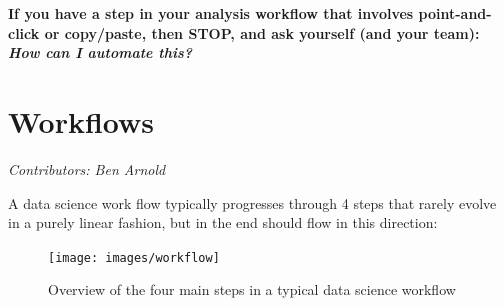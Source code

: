 \documentclass[
]{book}
\begin{document}
\textbf{If you have a step in your analysis workflow that involves point-and-click or copy/paste, then STOP, and ask yourself (and your team): } \textbf{\emph{How can I automate this?}}

\chapter{Workflows}\label{workflows}

\emph{Contributors: Ben Arnold}

A data science work flow typically progresses through 4 steps that rarely evolve in a purely linear fashion, but in the end should flow in this direction:

\begin{figure}
\texttt{[image: images/workflow]} \caption{Overview of the four main steps in a typical data science workflow}\label{fig:fig-workflow2}
\end{figure}
\end{document}
